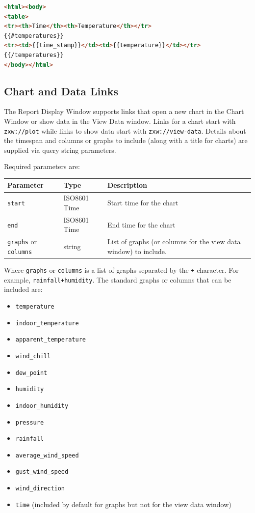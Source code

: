 \documentclass[a4paper,10pt]{book}
\begin{document}
\begin{lstlisting}[language=HTML]
<html><body>
<table>
<tr><th>Time</th><th>Temperature</th></tr>
{{#temperatures}}
<tr><td>{{time_stamp}}</td><td>{{temperature}}</td></tr>
{{/temperatures}}
</body></html>
\end{lstlisting}

\subsection{Chart and Data  Links}
The Report Display Window supports links that open a new chart in the Chart Window or show data in the View Data window. Links for a chart start with \verb|zxw://plot| while links to show data start with \verb|zxw://view-data|. Details about the timespan and columns or graphs to include (along with a title for charts) are supplied via query string parameters.

Required parameters are:

\begin{tabular}{p{3.5cm} p{2.5cm} p{7.6cm}}
\hline
\textbf{Parameter} & \textbf{Type} & \textbf{Description} \\
\hline
\verb|start| & ISO8601 Time & Start time for the chart \\
\verb|end| & ISO8601 Time & End time for the chart \\
\verb|graphs| or \verb|columns|& string & List of graphs (or columns for the view data window) to include.\\
\hline
\end{tabular}

Where \verb|graphs| or \verb|columns| is a list of graphs separated by the \verb|+| character. For example, \verb|rainfall+humidity|. The standard graphs or columns that can be included are:
\begin{itemize}
\item \verb|temperature|
\item \verb|indoor_temperature|
\item \verb|apparent_temperature|
\item \verb|wind_chill|
\item \verb|dew_point|
\item \verb|humidity|
\item \verb|indoor_humidity|
\item \verb|pressure|
\item \verb|rainfall|
\item \verb|average_wind_speed|
\item \verb|gust_wind_speed|
\item \verb|wind_direction|
\item \verb|time| (included by default for graphs but not for the view data window)
\end{itemize}
\end{document}
